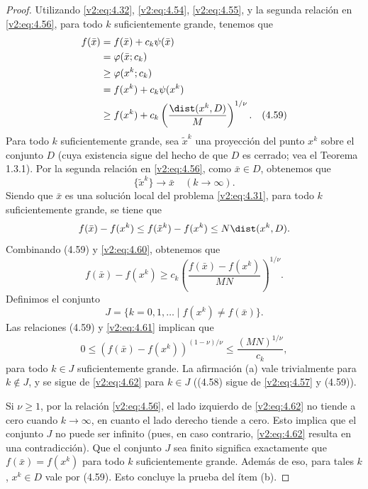 \begin{proof}
    Utilizando \eqref{v2:eq:4.32}, \eqref{v2:eq:4.54}, \eqref{v2:eq:4.55}, y la segunda relación en \eqref{v2:eq:4.56}, para todo $k$ suficientemente grande, tenemos que
    \begin{align*}
        f(\bar{x}) &= f(\bar{x}) + c_k\psi(\bar{x}) \\
        &= \varphi(\bar{x}; c_k) \\
        &\ge \varphi(x^k; c_k) \\
        &= f(x^k) + c_k\psi(x^k) \\
        &\ge f(x^k) + c_k \left( \frac{\dist(x^k, D)}{M} \right)^{1/\nu}. \quad (4.59)
    \end{align*}
    Para todo $k$ suficientemente grande, sea $\tilde{x}^k$ una proyección del punto $x^k$ sobre el conjunto $D$ (cuya existencia sigue del hecho de que $D$ es cerrado; vea el Teorema 1.3.1). Por la segunda relación en \eqref{v2:eq:4.56}, como $\bar{x} \in D$, obtenemos que
    \[
        \{\tilde{x}^k\} \to \bar{x} \quad (k \to \infty).
    \]
    Siendo que $\bar{x}$ es una solución local del problema \eqref{v2:eq:4.31}, para todo $k$ suficientemente grande, se tiene que
    \begin{equation}
        f(\bar{x}) - f(x^k) \le f(\tilde{x}^k) - f(x^k) \le N\dist(x^k, D).
        \label{v2:eq:4.60}
    \end{equation}
    Combinando (4.59) y \eqref{v2:eq:4.60}, obtenemos que
    \begin{equation}
        f(\bar{x}) - f(x^k) \ge c_k \left( \frac{f(\bar{x}) - f(x^k)}{MN} \right)^{1/\nu}.
        \label{v2:eq:4.61}
    \end{equation}
    Definimos el conjunto
    \[
        J = \{k = 0, 1, \dots \mid f(x^k) \neq f(\bar{x})\}.
    \]
    Las relaciones (4.59) y \eqref{v2:eq:4.61} implican que
    \begin{equation}
        0 \le (f(\bar{x}) - f(x^k))^{(1 - \nu)/\nu} \le \frac{(MN)^{1/\nu}}{c_k},
        \label{v2:eq:4.62}
    \end{equation}
    para todo $k \in J$ suficientemente grande.
    La afirmación (a) vale trivialmente para $k \notin J$, y se sigue de \eqref{v2:eq:4.62} para $k \in J$ ((4.58) sigue de \eqref{v2:eq:4.57} y (4.59)).
    
    Si $\nu \ge 1$, por la relación \eqref{v2:eq:4.56}, el lado izquierdo de \eqref{v2:eq:4.62} no tiende a cero cuando $k \to \infty$, en cuanto el lado derecho tiende a cero. Esto implica que el conjunto $J$ no puede ser infinito (pues, en caso contrario, \eqref{v2:eq:4.62} resulta en una contradicción). Que el conjunto $J$ sea finito significa exactamente que $f(\bar{x}) = f(x^k)$ para todo $k$ suficientemente grande. Además de eso, para tales $k$, $x^k \in D$ vale por (4.59). Esto concluye la prueba del ítem (b).
\end{proof}


